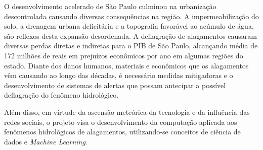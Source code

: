 O  desenvolvimento  acelerado  de  São  Paulo  culminou  na  urbanização  descontrolada causando diversas consequências na região.   A impermeabilização do solo,  a drenagem urbana deficitária e a topografia favorável ao acúmulo de água,  são reflexos desta expansão desordenada. A deflagração de alagamentos causaram diversas perdas diretas e indiretas para o PIB de São Paulo, alcançando média de 172 milhões de reais em prejuízos econômicos por ano em algumas regiões do estado. Diante dos danos humanos, materiais e econômicos que os alagamentos vêm causando ao longo das décadas, é necessário medidas mitigadoras e o desenvolvimento de sistemas de alertas que possam antecipar a possível deflagração do fenômeno hidrológico. 
\par Além disso, em virtude da ascensão meteórica da tecnologia e da influência das redes sociais, o projeto visa o desenvolvimento da computação aplicada aos fenômenos hidrológicos de alagamentos, utilizando-se conceitos de ciência de dados e \textit{Machine Learning}.